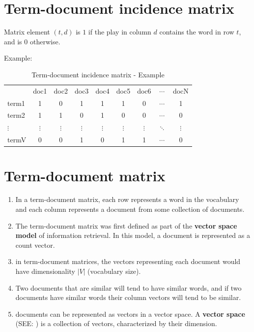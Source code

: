 \section{Term-document incidence matrix \cite{ir-1}}\label{Term-document incidence matrix}

Matrix element $(t, d)$ is $1$ if the play in column $d$ contains the word in row $t$, and is $0$ otherwise.

Example:
\begin{table}[h]
    \centering
    \begin{tabular}{l c c c c c c c c}
         & doc1 & doc2 & doc3 & doc4 & doc5 & doc6 & $\cdots$ & docN \\
        term1 & 1 & 0 & 1 & 1 & 1 & 0 & $\cdots$ & 1 \\ 
        term2 & 1 & 1 & 0 & 1 & 0 & 0 & $\cdots$ & 0 \\ 
        $\vdots$ & $\vdots$ & $\vdots$ & $\vdots$ & $\vdots$ & $\vdots$ & $\vdots$ & $\ddots$ & $\vdots$ \\
        termV & 0 & 0 & 1 & 0 & 1 & 1 & $\cdots$ & 0 \\ 
    \end{tabular}
    \caption{Term-document incidence matrix - Example}
\end{table}



\section{Term-document matrix \cite{nlp-1}}\label{Term-document matrix}

\begin{enumerate}
    \item In a term-document matrix, each row represents a word in the vocabulary and each column represents a document from some collection of documents.
    
    \item The term-document matrix was first defined as part of the \textbf{vector space model} of information retrieval. In this model, a document is represented as a count vector.

    \item in term-document matrices, the vectors representing each document would have dimensionality $|V|$ (vocabulary size).

    \item Two documents that are similar will tend to have similar words, and if two documents have similar words their column vectors will tend to be similar.

    \item documents can be represented as vectors in a vector space. A \textbf{vector space} (SEE: ) is a collection of vectors, characterized by their dimension.
\end{enumerate}


